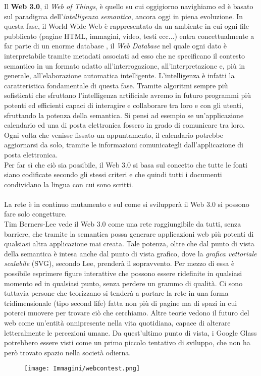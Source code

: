 \documentclass[a4paper, 11pt, oneside]{book}
\theoremstyle{plain}
\begin{document}
Il \textbf{Web 3.0}, il \textit{Web of Things}, è quello su cui oggigiorno navighiamo ed è basato sul paradigma dell'\textit{intelligenza semantica}, ancora oggi in piena evoluzione. In questa fase, il World Wide Web è rappresentato da un ambiente in cui ogni file pubblicato (pagine HTML, immagini, video, testi ecc...) entra concettualmente a far parte di un enorme database , il\textit{ Web Database} nel quale ogni dato è interpretabile tramite metadati associati ad esso che ne specificano il contesto semantico in un formato adatto all'interrogazione, all'interpretazione e, più in generale, all'elaborazione automatica intelligente. L'intelligenza è infatti la caratteristica fondamentale di questa fase. Tramite algoritmi sempre più sofisticati che sfruttano l'intelligenza artificiale avremo in futuro programmi più potenti ed efficienti capaci di interagire e collaborare tra loro e con gli utenti, sfruttando la potenza della semantica. Si pensi ad esempio se un'applicazione calendario ed una di posta elettronica fossero in grado di comunicare tra loro. Ogni volta che venisse fissato un appuntamento, il calendario potrebbe aggiornarsi da solo, tramite le informazioni comunicategli dall'applicazione di posta elettronica.\\ Per far sì che ciò sia possibile, il Web 3.0 si basa sul concetto che tutte le fonti siano codificate secondo gli stessi criteri e che quindi tutti i documenti condividano la lingua con cui sono scritti. \\\\
La rete è in continuo mutamento e sul come si svilupperà il Web 3.0 si possono fare solo congetture.\\Tim Berners-Lee vede il Web 3.0 come una rete raggiungibile da tutti, senza barriere, che tramite la semantica possa generare applicazioni web più potenti di qualsiasi altra applicazione mai creata. Tale potenza, oltre che dal punto di vista della semantica è intesa anche dal punto di vista grafico, dove la \textit{grafica vettoriale scalabile} (SVG), secondo Lee, prenderà il sopravvento. Per mezzo di essa è possibile esprimere figure interattive che possono essere ridefinite in qualsiasi momento ed in qualsiasi punto, senza perdere un grammo di qualità. Ci sono tuttavia persone che teorizzano si tenderà a portare la rete in una forma tridimensionale (tipo second life) fatta non più di pagine ma di spazi in cui poterci muovere per trovare ciò che cerchiamo. Altre teorie vedono il futuro del web come un'entità onnipresente nella vita quotidiana, capace di alterare letteralmente le percezioni umane. Da quest'ultimo punto di vista, i Google Glass potrebbero essere visti come un primo piccolo tentativo di sviluppo, che non ha però trovato spazio nella società odierna. \\
\begin{figure}[h]
\begin{center}
\texttt{[image: Immagini/webcontest.png]}

\end{center}
\end{figure}
\end{document}
